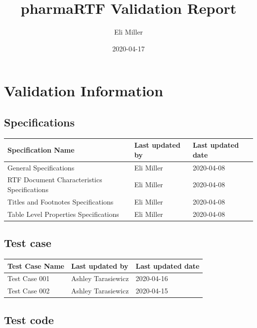 \documentclass[]{article}
\title{pharmaRTF Validation Report}
\author{Eli Miller}
\date{2020-04-17}
\begin{document}
\maketitle

\newpage
\tableofcontents
\newpage

\hypertarget{validation-information}{%
\section{Validation Information}\label{validation-information}}

\hypertarget{specifications}{%
\subsection{Specifications}\label{specifications}}

\begin{table}[H]
\centering
\begin{tabular}{l|l|l}
\hline
Specification Name & Last updated by & Last updated date\\
\hline
General Specifications & Eli Miller & 2020-04-08\\
\hline
RTF Document Characteristics Specifications & Eli Miller & 2020-04-08\\
\hline
Titles and Footnotes Specifications & Eli Miller & 2020-04-08\\
\hline
Table Level Properties Specifications & Eli Miller & 2020-04-08\\
\hline
\end{tabular}
\end{table}

\hypertarget{test-case}{%
\subsection{Test case}\label{test-case}}

\begin{table}[H]
\centering
\begin{tabular}{l|l|l}
\hline
Test Case Name & Last updated by & Last updated date\\
\hline
Test Case 001 & Ashley Tarasiewicz & 2020-04-16\\
\hline
Test Case 002 & Ashley Tarasiewicz & 2020-04-15\\
\hline
\end{tabular}
\end{table}

\hypertarget{test-code}{%
\subsection{Test code}\label{test-code}}
\end{document}
